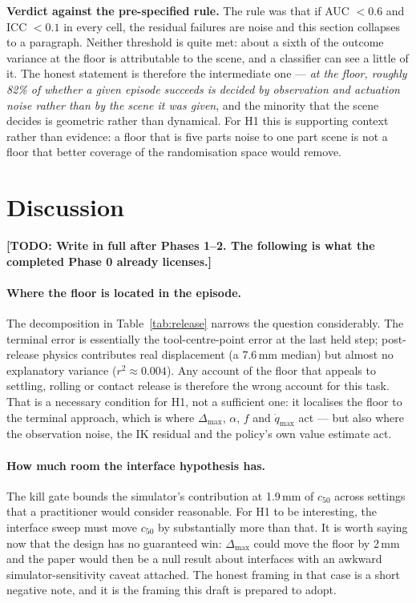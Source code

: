 \documentclass{article}
\newcommand{\todo}[1]{{\color{red}\textbf{[TODO: #1]}}}
\newcommand{\dmax}{\Delta_{\max}}
\newcommand{\qdmax}{\dot q_{\max}}
\begin{document}
\textbf{Verdict against the pre-specified rule.} The rule was that if
AUC $<0.6$ and ICC $<0.1$ in every cell, the residual failures are noise and
this section collapses to a paragraph. Neither threshold is quite met: about a
sixth of the outcome variance at the floor is attributable to the scene, and a
classifier can see a little of it. The honest statement is therefore the
intermediate one --- \emph{at the floor, roughly 82\% of whether a given episode
succeeds is decided by observation and actuation noise rather than by the scene
it was given}, and the minority that the scene decides is geometric rather than
dynamical. For H1 this is supporting context rather than evidence: a floor that
is five parts noise to one part scene is not a floor that better coverage of the
randomisation space would remove.

\section{Discussion}
\label{sec:discussion}

\todo{Write in full after Phases 1--2. The following is what the completed
Phase 0 already licenses.}

\paragraph{Where the floor is located in the episode.} The decomposition in
Table~\ref{tab:release} narrows the question considerably. The terminal error is
essentially the tool-centre-point error at the last held step; post-release
physics contributes real displacement (a 7.6\,mm median) but almost no
explanatory variance ($r^2 \approx 0.004$). Any account of the floor that
appeals to settling, rolling or contact release is therefore the wrong account
for this task. That is a necessary condition for H1, not a sufficient one: it
localises the floor to the terminal approach, which is where $\dmax$, $\alpha$,
$f$ and $\qdmax$ act --- but also where the observation noise, the IK residual
and the policy's own value estimate act.

\paragraph{How much room the interface hypothesis has.} The kill gate bounds the
simulator's contribution at 1.9\,mm of $c_{50}$ across settings that a
practitioner would consider reasonable. For H1 to be interesting, the interface
sweep must move $c_{50}$ by substantially more than that. It is worth saying now
that the design has no guaranteed win: $\dmax$ could move the floor by 2\,mm and
the paper would then be a null result about interfaces with an awkward
simulator-sensitivity caveat attached. The honest framing in that case is a
short negative note, and it is the framing this draft is prepared to adopt.
\end{document}
